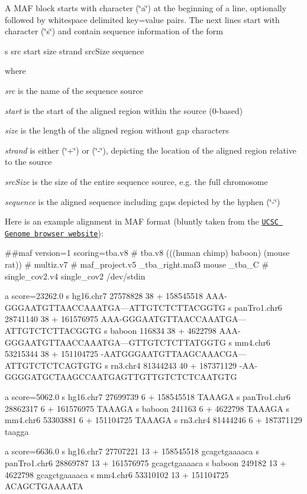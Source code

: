 A M\+AF block starts with character (\char`\"{}a\char`\"{}) at the beginning of a line, optionally followed by whitespace delimited key=value pairs. The next lines start with character (\char`\"{}s\char`\"{}) and contain sequence information of the form \begin{DoxyVerb}s src start size strand srcSize sequence
\end{DoxyVerb}
 where
\begin{DoxyItemize}
\item {\itshape src} is the name of the sequence source
\item {\itshape start} is the start of the aligned region within the source (0-\/based)
\item {\itshape size} is the length of the aligned region without gap characters
\item {\itshape strand} is either (\char`\"{}+\char`\"{}) or (\char`\"{}-\/\char`\"{}), depicting the location of the aligned region relative to the source
\item {\itshape src\+Size} is the size of the entire sequence source, e.\+g. the full chromosome
\item {\itshape sequence} is the aligned sequence including gaps depicted by the hyphen (\char`\"{}-\/\char`\"{})
\end{DoxyItemize}Here is an example alignment in M\+AF format (bluntly taken from the \href{https://cgwb.nci.nih.gov/FAQ/FAQformat.html#format5}{\tt U\+C\+SC Genome browser website})\+: 
\begin{DoxyVerbInclude}
##maf version=1 scoring=tba.v8 
# tba.v8 (((human chimp) baboon) (mouse rat)) 
# multiz.v7
# maf_project.v5 _tba_right.maf3 mouse _tba_C
# single_cov2.v4 single_cov2 /dev/stdin
                   
a score=23262.0     
s hg16.chr7    27578828 38 + 158545518 AAA-GGGAATGTTAACCAAATGA---ATTGTCTCTTACGGTG
s panTro1.chr6 28741140 38 + 161576975 AAA-GGGAATGTTAACCAAATGA---ATTGTCTCTTACGGTG
s baboon         116834 38 +   4622798 AAA-GGGAATGTTAACCAAATGA---GTTGTCTCTTATGGTG
s mm4.chr6     53215344 38 + 151104725 -AATGGGAATGTTAAGCAAACGA---ATTGTCTCTCAGTGTG
s rn3.chr4     81344243 40 + 187371129 -AA-GGGGATGCTAAGCCAATGAGTTGTTGTCTCTCAATGTG
                   
a score=5062.0                    
s hg16.chr7    27699739 6 + 158545518 TAAAGA
s panTro1.chr6 28862317 6 + 161576975 TAAAGA
s baboon         241163 6 +   4622798 TAAAGA 
s mm4.chr6     53303881 6 + 151104725 TAAAGA
s rn3.chr4     81444246 6 + 187371129 taagga

a score=6636.0
s hg16.chr7    27707221 13 + 158545518 gcagctgaaaaca
s panTro1.chr6 28869787 13 + 161576975 gcagctgaaaaca
s baboon         249182 13 +   4622798 gcagctgaaaaca
s mm4.chr6     53310102 13 + 151104725 ACAGCTGAAAATA

\end{DoxyVerbInclude}
